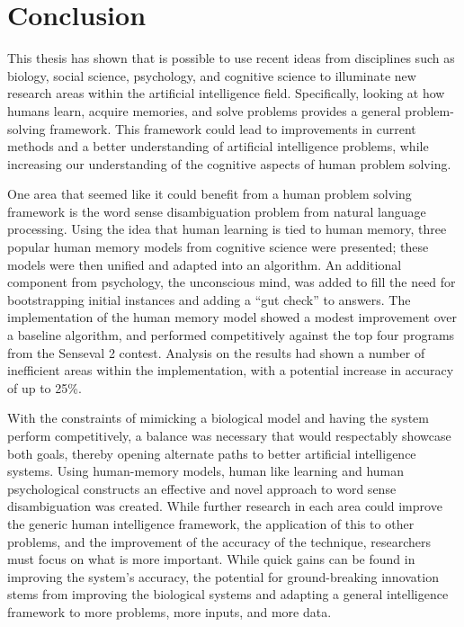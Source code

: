 \chapter{Conclusion}

This thesis has shown that is possible to use recent ideas from disciplines such as biology, social science, psychology, and cognitive science to illuminate new research areas within the artificial intelligence field.  Specifically, looking at how humans learn, acquire memories, and solve problems provides a general problem-solving framework.  This framework could lead to improvements in current methods and a better understanding of artificial intelligence problems, while increasing our understanding of the cognitive aspects of human problem solving.  

One area that seemed like it could benefit from a human problem solving framework is the word sense disambiguation problem from natural language processing. Using the idea that human learning is tied to human memory, three popular human memory models from cognitive science were presented; these models were then unified and adapted into an algorithm.  An additional component from psychology, the unconscious mind, was added to fill the need for bootstrapping initial instances and adding a ``gut check'' to answers. The implementation of the human memory model showed a modest improvement over a baseline algorithm, and performed competitively against the top four programs from the Senseval 2 contest.  Analysis on the results had shown a number of inefficient areas within the implementation, with a potential increase in accuracy of up to 25\%.

With the constraints of mimicking a biological model and having the system perform competitively, a balance was necessary that would respectably showcase both goals, thereby  opening alternate paths to better artificial intelligence systems. Using human-memory models, human like learning and human psychological constructs an effective and novel approach to word sense disambiguation was created.  While further research in each area could improve the generic human intelligence framework, the application of this to other problems, and the improvement of the accuracy of the technique, researchers must focus on what is more important.  While quick gains can be found in improving the system's accuracy, the potential for ground-breaking innovation stems from improving the biological systems and adapting a general intelligence framework to more problems, more inputs, and more data.

